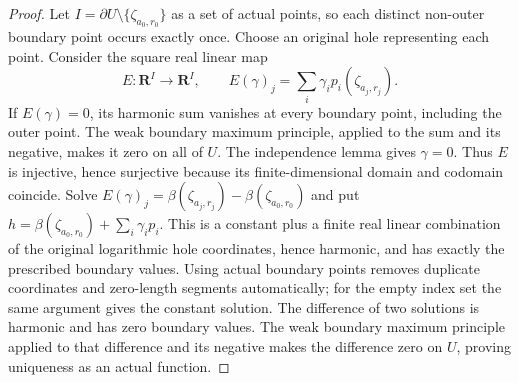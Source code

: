 \begin{proof}
Let $I=\partial U\setminus\{\zeta_{a_0,r_0}\}$ as a set of actual points,
so each distinct non-outer boundary point occurs exactly once. Choose an
original hole representing each point. Consider the square real linear map
\[
 E\colon\mathbf R^I\longrightarrow\mathbf R^I,\qquad
 E(\gamma)_j=\sum_i\gamma_i p_i(\zeta_{a_j,r_j}).
\]
If $E(\gamma)=0$, its harmonic sum vanishes at every boundary point,
including the outer point. The weak boundary maximum principle, applied to
the sum and its negative, makes it zero on all of $U$. The independence
lemma gives $\gamma=0$. Thus $E$ is injective, hence surjective because its
finite-dimensional domain and codomain coincide. Solve
$E(\gamma)_j=\beta(\zeta_{a_j,r_j})-\beta(\zeta_{a_0,r_0})$ and put
$h=\beta(\zeta_{a_0,r_0})+\sum_i\gamma_i p_i$. This is a constant plus a
finite real linear combination of the original logarithmic hole coordinates,
hence harmonic, and has exactly the prescribed boundary values.
Using actual boundary points removes duplicate coordinates and zero-length
segments automatically; for the empty index set the same argument gives
the constant solution.
The difference of two solutions is harmonic and has zero boundary values.
The weak boundary maximum principle applied to that difference and its
negative makes the difference zero on $U$, proving uniqueness as an actual
function.
\end{proof}
